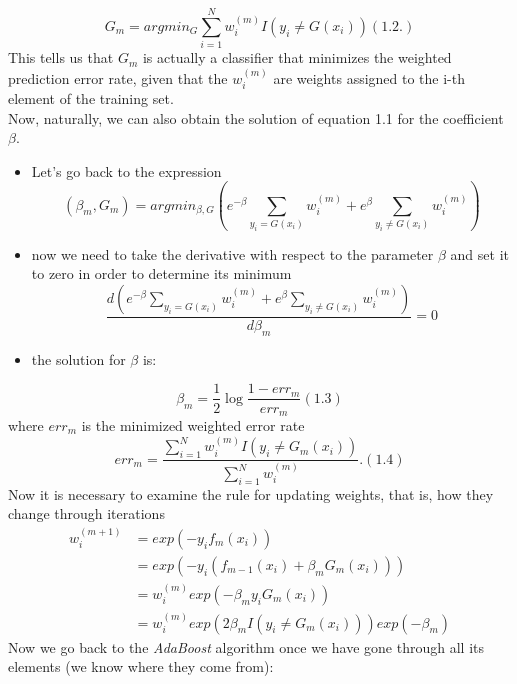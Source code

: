 \documentclass[12pt, letterpaper, twoside]{article}
\begin{document}
 \begin{equation*}
G_m=argmin_G\sum_{i=1}^N w_i^{(m)}I(y_i\neq G(x_i)) (1.2.)
\end{equation*}
This tells us that $G_m$ is actually a classifier that minimizes the weighted prediction error rate, given that the $w_i^{(m)}$ are weights assigned to the i-th element of the training set.\\
Now, naturally, we can also obtain the solution of equation 1.1 for the coefficient $\beta$.
\begin{itemize}
\item Let's go back to the expression
\begin{equation*}
(\beta_m,G_m)=argmin_{\beta,G}(e^{-\beta}\sum_{y_i=G(x_i)} w_i^{(m)} +e^{\beta}\sum_{y_i\not=G(x_i)}w_i^{(m)})
\end{equation*}
\item now we need to take the derivative with respect to the parameter $\beta$ and set it to zero in order to determine its minimum
\begin{equation*}
\frac{d(e^{-\beta}\sum_{y_i=G(x_i)} w_i^{(m)} +e^{\beta}\sum_{y_i\not=G(x_i)}w_i^{(m)})}{d\beta_m} = 0
\end{equation*}
\item the solution for $\beta$ is:
\end{itemize}
\begin{equation*}
\beta_m=\frac{1}{2}\log \frac{1-err_m}{err_m} (1.3)
\end{equation*}
where $err_m$ is the minimized weighted error rate
\begin{equation*}
err_m=\frac{\sum_{i=1}^N w_i^{(m)}I(y_i\neq G_m(x_i))}{\sum_{i=1}^N w_i^{(m)}}. (1.4)
\end{equation*}
Now it is necessary to examine the rule for updating weights, that is, how they change through iterations
\begin{equation*}
 \begin{aligned}
w_i^{(m+1)} &=exp(-y_if_m(x_i))\\
& =exp(-y_i(f_{m-1}(x_i)+\beta_mG_m(x_i)))\\
& =w_i^{(m)}exp(-\beta_m y_i G_m(x_i))\\
& =w_i^{(m)}exp(2\beta_mI(y_i\not=G_m(x_i)))exp(-\beta_m)
\end{aligned}
\end{equation*}
Now we go back to the \emph{AdaBoost} algorithm once we have gone through all its elements (we know where they come from):
\end{document}
